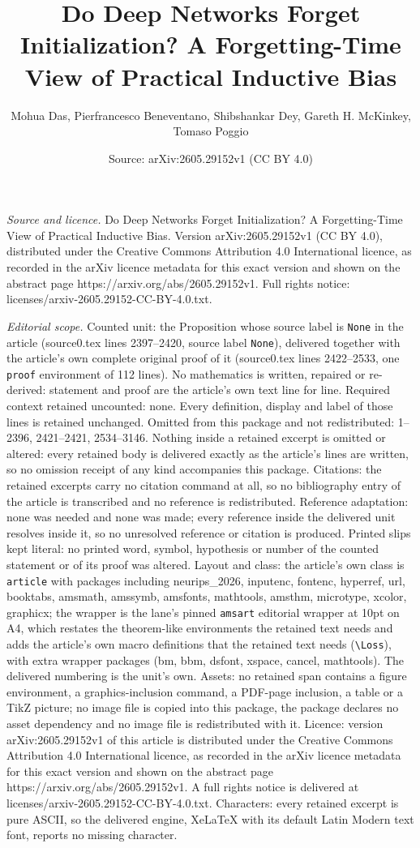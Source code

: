 \documentclass[10pt,a4paper]{amsart}
\title[Do Deep Networks Forget Initialization? A Forgetting-Time Vi]{Do Deep Networks Forget Initialization? A Forgetting-Time View of Practical Inductive Bias}
\author{Mohua Das, Pierfrancesco Beneventano, Shibshankar Dey, Gareth H. McKinkey, Tomaso Poggio}
\date{Source: arXiv:2605.29152v1 (CC BY 4.0)}
\begin{document}
\maketitle

\noindent\emph{Source and licence.} Do Deep Networks Forget Initialization? A Forgetting-Time View of Practical Inductive Bias. Version arXiv:2605.29152v1 (CC BY 4.0), distributed under the Creative Commons Attribution 4.0 International licence, as recorded in the arXiv licence metadata for this exact version and shown on the abstract page https://arxiv.org/abs/2605.29152v1. Full rights notice: licenses/arxiv-2605.29152-CC-BY-4.0.txt.\par\smallskip

\noindent\textit{Editorial scope.} Counted unit: the Proposition whose source label is \texttt{None} in the article (source0.tex lines 2397--2420, source label \texttt{None}), delivered together with the article's own complete original proof of it (source0.tex lines 2422--2533, one \texttt{proof} environment of 112 lines). No mathematics is written, repaired or re-derived: statement and proof are the article's own text line for line. Required context retained uncounted: none. Every definition, display and label of those lines is retained unchanged. Omitted from this package and not redistributed: 1--2396, 2421--2421, 2534--3146. Nothing inside a retained excerpt is omitted or altered: every retained body is delivered exactly as the article's lines are written, so no omission receipt of any kind accompanies this package. Citations: the retained excerpts carry no citation command at all, so no bibliography entry of the article is transcribed and no reference is redistributed. Reference adaptation: none was needed and none was made; every reference inside the delivered unit resolves inside it, so no unresolved reference or citation is produced. Printed slips kept literal: no printed word, symbol, hypothesis or number of the counted statement or of its proof was altered. Layout and class: the article's own class is \texttt{article} with packages including neurips\_2026, inputenc, fontenc, hyperref, url, booktabs, amsmath, amssymb, amsfonts, mathtools, amsthm, microtype, xcolor, graphicx; the wrapper is the lane's pinned \texttt{amsart} editorial wrapper at 10pt on A4, which restates the theorem-like environments the retained text needs and adds the article's own macro definitions that the retained text needs (\texttt{\textbackslash Loss}), with extra wrapper packages (bm, bbm, dsfont, xspace, cancel, mathtools). The delivered numbering is the unit's own. Assets: no retained span contains a figure environment, a graphics-inclusion command, a PDF-page inclusion, a table or a TikZ picture; no image file is copied into this package, the package declares no asset dependency and no image file is redistributed with it. Licence: version arXiv:2605.29152v1 of this article is distributed under the Creative Commons Attribution 4.0 International licence, as recorded in the arXiv licence metadata for this exact version and shown on the abstract page https://arxiv.org/abs/2605.29152v1. A full rights notice is delivered at licenses/arxiv-2605.29152-CC-BY-4.0.txt. Characters: every retained excerpt is pure ASCII, so the delivered engine, XeLaTeX with its default Latin Modern text font, reports no missing character.
\end{document}
